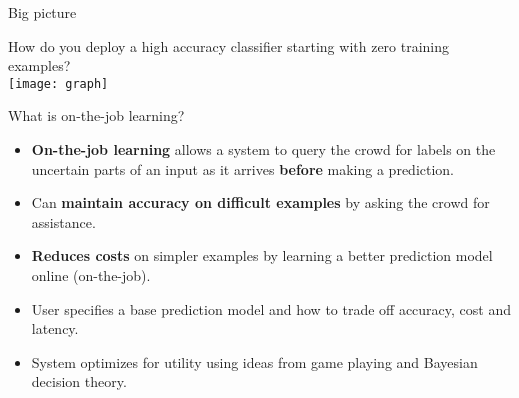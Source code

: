 \vfill
\begin{block}{Big picture}
  \begin{center}
  {\large How do you deploy a high accuracy classifier starting with zero training examples?}\\
  \texttt{[image: graph]}
  \end{center}

\end{block}
\vfill

\begin{block}{What is on-the-job learning?}
  \begin{itemize}
    \item 
  \textbf{On-the-job learning} allows a system to query the crowd for labels on the uncertain parts of an input as it arrives \textbf{before} making a prediction.


    \item Can \textbf{maintain accuracy on difficult examples} by asking the crowd for assistance.
    \item \textbf{Reduces costs} on simpler examples by learning a better prediction model online (on-the-job).
    \item User specifies a base prediction model and how to trade off accuracy, cost and latency. 
    \item System optimizes for utility using ideas from game playing and Bayesian decision theory.
  \end{itemize}
\end{block}
\vfill

